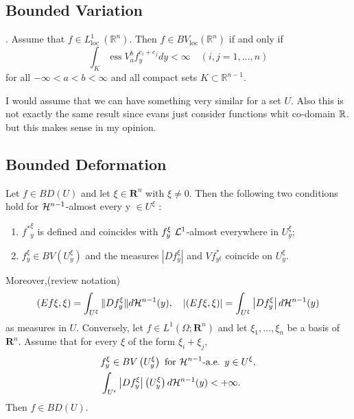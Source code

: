 \subsection{Bounded Variation}
\begin{theorem} . Assume that $f \in L_{\text {loc }}^1\left(\mathbb{R}^n\right)$. Then $f \in B V_{\mathrm{loc}}\left(\mathbb{R}^n\right)$ if and only if
$$
\int_K \operatorname{ess} V_a^b f_y^{e_i+ e_j} d y<\infty \quad(i,j=1, \ldots, n)
$$
for all $-\infty<a<b<\infty$ and all compact sets $K \subset \mathbb{R}^{n-1}$.
\end{theorem}
\begin{com}
I would assume that we can have something very similar for a set $U$. Also this is not exactly the same result since evans just consider functions whit co-domain $\mathbb{R}$. but this makes sense in my opinion.
\end{com}
\subsection{Bounded Deformation}


\begin{proposition}
 Let $f \in B D(U)$ and let $\xi \in \mathbf{R}^n$ with $\xi \neq 0$. Then the following two conditions hold for ${\mathcal H}^{n-1}$-almost every y $\in U^{\xi}$ :\begin{enumerate}
\item ${f^*}_y^{\xi}$ is defined and coincides with $f_y^\xi \ {\mathcal L} ^1$-almost everywhere in $U_y^{\xi}$;
\item $f_y^{\xi} \in B V\left(U_y^{\xi}\right)$ and the measures $|D f_y^{\xi}|$ and $V f^*_{y^{\xi}}$ coincide on $U_y^{\xi}$.
\end{enumerate}

Moreover,(review notation)
$$(Ef \xi, \xi)=\int_{U^{\xi}} \|D f_y^{\xi}\| d {\mathcal H}^{n-1}(y), \quad|(E f \xi, \xi)|=\int_{U^{\xi}}\left|D f_y^{\xi}\right| d {\mathcal H}^{n-1}(y)$$
as measures in $U$. Conversely, let $f \in L^1\left(\Omega ; \mathbf{R}^n\right)$ and let $\xi_1, \ldots, \xi_n$ be a basis of $\mathbf{R}^n$. Assume that for every $\xi$ of the form $\xi_i+\xi_j$,
$$
\begin{aligned}
&f_y^{\xi} \in B V\left(U_y^{\xi}\right) \text { for } {\mathcal H}^{n-1} \text {-a.e. } y \in U^{\xi}, \\
&\int_{U^{\epsilon}}\left|D f_y^{\xi}\right|\left(U_y^{\xi}\right) d {\mathcal H}^{n-1}(y)<+\infty .
\end{aligned}
$$
Then $f \in B D(U)$.
\end{proposition}


